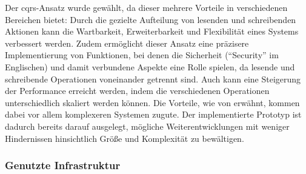 \documentclass[a4paper,12pt,twoside,numbers=noendperiod]{scrreprt}
\begin{document}
Der \ac{cqrs}-Ansatz wurde gewählt, da dieser mehrere Vorteile in verschiedenen Bereichen bietet: Durch die gezielte Aufteilung von lesenden und schreibenden Aktionen kann die Wartbarkeit, Erweiterbarkeit und Flexibilität eines Systems verbessert werden. Zudem ermöglicht dieser Ansatz eine präzisere Implementierung von Funktionen, bei denen die Sicherheit (\enquote{Security} im Englischen) und damit verbundene Aspekte eine Rolle spielen, da lesende und schreibende Operationen voneinander getrennt sind. Auch kann eine Steigerung der Performance erreicht werden, indem die verschiedenen Operationen unterschiedlich skaliert werden können. Die Vorteile, wie von \cite{ingeno_software_2018} erwähnt, kommen dabei vor allem komplexeren Systemen zugute. Der implementierte Prototyp ist dadurch bereits darauf ausgelegt, mögliche Weiterentwicklungen mit weniger Hindernissen hinsichtlich Größe und Komplexität zu bewältigen. \cite[240]{ingeno_software_2018}

\subsubsection*{Genutzte Infrastruktur}
\label{sub-sub-sec:backend-genutzte-infrastruktur}
\end{document}
